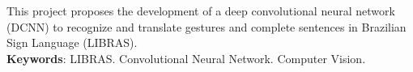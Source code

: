 
\begin{resumo}[ABSTRACT]

    \begin{SingleSpacing}
    
        This project proposes the development of a deep convolutional neural network (DCNN) to recognize and translate gestures and complete sentences in Brazilian Sign Language (LIBRAS). \\

        \textbf{Keywords}: LIBRAS. Convolutional Neural Network. Computer Vision.
    
    \end{SingleSpacing}
    
\end{resumo}

